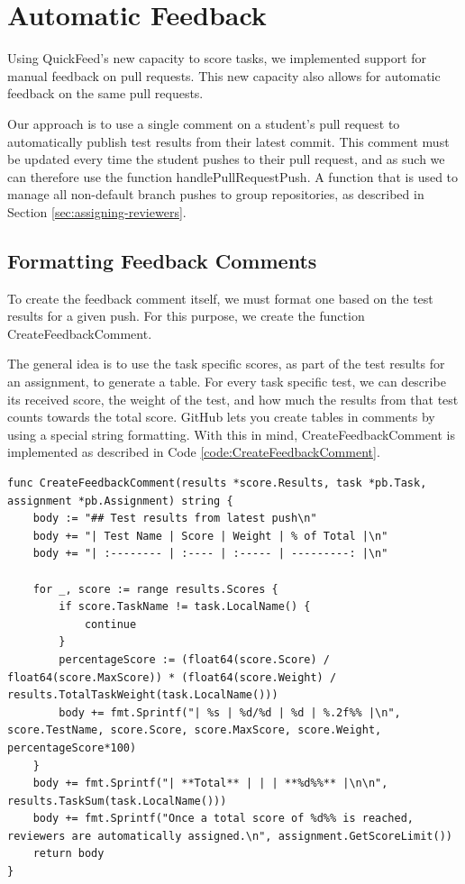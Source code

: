 \section{Automatic Feedback}

Using QuickFeed's new capacity to score tasks, we implemented support for manual feedback on pull requests.
This new capacity also allows for automatic feedback on the same pull requests.

Our approach is to use a single comment on a student's pull request to automatically publish test results from their latest commit.
This comment must be updated every time the student pushes to their pull request, and as such we can therefore use the function handlePullRequestPush.
A function that is used to manage all non-default branch pushes to group repositories, as described in Section \ref{sec:assigning-reviewers}.

\subsection{Formatting Feedback Comments}
\label{sec:formatting-feedback-comments}

To create the feedback comment itself, we must format one based on the test results for a given push.
For this purpose, we create the function CreateFeedbackComment.

The general idea is to use the task specific scores, as part of the test results for an assignment, to generate a table.
For every task specific test, we can describe its received score, the weight of the test, and how much the results from that test counts towards the total score.
GitHub lets you create tables in comments by using a special string formatting.
With this in mind, CreateFeedbackComment is implemented as described in Code \ref{code:CreateFeedbackComment}.

\begin{lstlisting}[caption={The CreateFeedbackComment function}, label={code:CreateFeedbackComment}, language=Golang]
func CreateFeedbackComment(results *score.Results, task *pb.Task, assignment *pb.Assignment) string {
	body := "## Test results from latest push\n"
	body += "| Test Name | Score | Weight | % of Total |\n"
	body += "| :-------- | :---- | :----- | ---------: |\n"

	for _, score := range results.Scores {
		if score.TaskName != task.LocalName() {
			continue
		}
		percentageScore := (float64(score.Score) / float64(score.MaxScore)) * (float64(score.Weight) / results.TotalTaskWeight(task.LocalName()))
		body += fmt.Sprintf("| %s | %d/%d | %d | %.2f%% |\n", score.TestName, score.Score, score.MaxScore, score.Weight, percentageScore*100)
	}
	body += fmt.Sprintf("| **Total** | | | **%d%%** |\n\n", results.TaskSum(task.LocalName()))
	body += fmt.Sprintf("Once a total score of %d%% is reached, reviewers are automatically assigned.\n", assignment.GetScoreLimit())
	return body
}
\end{lstlisting}

